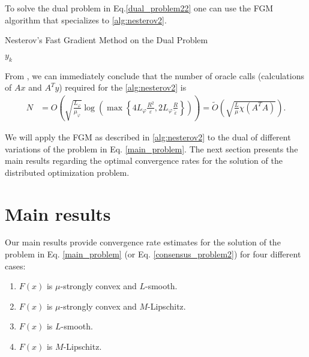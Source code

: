 \documentclass[final]{siamart1116}
\numberwithin{theorem}{section}
\begin{document}
	
	To solve the dual problem in Eq.\eqref{dual_problem22} one can use the FGM algorithm that  specializes to \cref{alg:nesterov2}.
	\begin{algorithm}[H]
		\caption{Nesterov's Fast Gradient Method on the Dual Problem}
		\label{alg:nesterov2}
		\begin{algorithmic}[1]
			\ENDWHILE
			\RETURN $y_k$
		\end{algorithmic}
	\end{algorithm}

	From \cite{dev12}, we can immediately conclude that the number of oracle calls (calculations of $Ax$ and $A^Ty$) required for the \cref{alg:nesterov2} is
	\begin{align}\label{bound_dual}
	N & = O \left( \sqrt{\frac{L_\varphi}{\mu_\varphi}} \log \left(\max\left\lbrace 4 L_\varphi\frac{R^2}{\varepsilon} ,2 L_\varphi \frac{R}{\tilde{\varepsilon}}\right\rbrace  \right) \right) = \tilde{O}\left( \sqrt{\frac{L}{\mu} \chi(A^TA) }\right).
	\end{align}
	
	
	We will apply the FGM as described in \cref{alg:nesterov2} to the dual of different variations of the problem in Eq. \eqref{main_problem}. The next section presents the main results regarding the optimal convergence rates for the solution of the distributed optimization problem.
	
	\section{Main results}\label{sec:main}
	
	Our main results provide convergence rate estimates for the solution of the problem in Eq. \eqref{main_problem} (or Eq. \eqref{consensus_problem2}) for four different cases: 
	\begin{enumerate}
		\item $F(x)$ is $\mu$-strongly convex and $L$-smooth.
		\item $F(x)$ is $\mu$-strongly convex and $M$-Lipschitz.
		\item $F(x)$ is $L$-smooth.
		\item $F(x)$ is $M$-Lipschitz.
	\end{enumerate}
\end{document}
